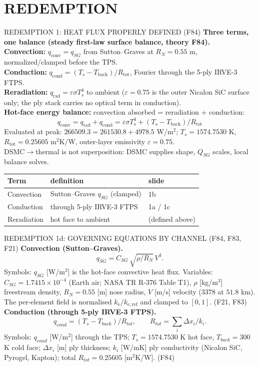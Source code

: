 \documentclass[aspectratio=169,11pt]{beamer}
\begin{document}
\section{REDEMPTION}

\begin{frame}{REDEMPTION 1: HEAT FLUX PROPERLY DEFINED (F84)}
  \small
  \textbf{Three terms, one balance (steady first-law surface balance, theory F84).}\\
  \textbf{Convection:} $q_{\mathrm{conv}}=q_{SG}$ from Sutton--Graves at $R_N=0.55$ m,
  normalized/clamped before the TPS.\\
  \textbf{Conduction:} $q_{\mathrm{cond}}=(T_s-T_{\mathrm{back}})/R_{\mathrm{tot}}$,
  Fourier through the 5-ply IRVE-3 FTPS.\\
  \textbf{Reradiation:} $q_{\mathrm{rad}}=\varepsilon\sigma T_s^4$ to ambient
  ($\varepsilon=0.75$ is the outer Nicalon SiC surface only; the ply stack carries
  no optical term in conduction).\\
  \textbf{Hot-face energy balance:} convection absorbed = reradiation + conduction:
  \[
  q_{\mathrm{conv}} = q_{\mathrm{rad}} + q_{\mathrm{cond}}
  = \varepsilon\sigma T_s^4 + (T_s - T_{\mathrm{back}})/R_{\mathrm{tot}}
  \]
  Evaluated at peak: $266509.3 = 261530.8 + 4978.5$ W/m$^2$;
  $T_s=1574.7530$ K, $R_{\mathrm{tot}}=0.25605$ m$^2$K/W,
  outer-layer emissivity $\varepsilon=0.75$.\\
  DSMC$\rightarrow$thermal is not superposition: DSMC supplies shape, $Q_{SG}$ scales, local balance solves.\\
  \begin{tabular}{@{}lll@{}}
  \textbf{Term} & \textbf{definition} & \textbf{slide}\\
  \hline
  Convection & Sutton--Graves $q_{SG}$ (clamped) & 1b\\
  Conduction & through 5-ply IRVE-3 FTPS & 1a / 1c\\
  Reradiation & hot face to ambient & (defined above)\\
  \end{tabular}
\end{frame}


\begin{frame}{REDEMPTION 1d: GOVERNING EQUATIONS BY CHANNEL (F84, F83, F21)}
  \small
  \textbf{Convection (Sutton--Graves).}
  \[
    q_{SG}=C_{SG}\,\sqrt{\rho/R_N}\,V^3.
  \]
  Symbols: $q_{SG}$ [W/m$^2$] is the hot-face convective heat flux.
  Variables: $C_{SG}=1.7415\times 10^{-4}$ (Earth air; NASA TR R-376 Table T1),
  $\rho$ [kg/m$^3$] freestream density, $R_N=0.55$ [m] nose radius,
  $V$ [m/s] velocity ($3378$ at $51.8$ km). The per-element field is normalised
  $k_{\mathrm{e}}/k_{\mathrm{e,ref}}$ and clamped to $[0,1]$. (F21, F83) \\

  \textbf{Conduction (through 5-ply IRVE-3 FTPS).}
  \[
    q_{cond}=(T_s-T_{back})/R_{tot},\qquad
    R_{tot}=\sum_i \Delta x_i/k_i.
  \]
  Symbols: $q_{cond}$ [W/m$^2$] through the TPS; $T_s=1574.7530$ K hot face,
  $T_{back}=300$ K cold face; $\Delta x_i$ [m] ply thickness; $k_i$ [W/mK]
  ply conductivity (Nicalon SiC, Pyrogel, Kapton); total
  $R_{tot}=0.25605$ [m$^2$K/W]. (F84)
\end{frame}
\end{document}

